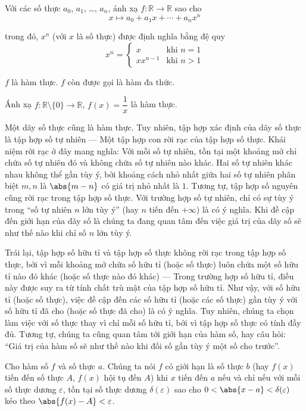 \begin{example}
    Với các số thực $a_{0}$, $a_{1}$, \ldots, $a_{n}$, ánh xạ $f: \mathbb{R}\to \mathbb{R}$ sao cho
    \[
        x\mapsto a_{0} + a_{1}x + \cdots + a_{n}x^{n}
    \]

    trong đó, $x^{n}$ (với $x$ là số thực) được định nghĩa bằng đệ quy
    \[
        x^{n} = \begin{cases}
            x        & \text{khi $n = 1$} \\
            xx^{n-1} & \text{khi $n > 1$}
        \end{cases}
    \]

    $f$ là hàm thực. $f$ còn được gọi là hàm đa thức.
\end{example}

\begin{example}
    Ánh xạ $f: \mathbb{R}\setminus\{ 0 \}\to \mathbb{R}$, $f(x) = \dfrac{1}{x}$ là hàm thực.
\end{example}

Một dãy số thực cũng là hàm thực. Tuy nhiên, tập hợp xác định của dãy số thực là tập hợp số tự nhiên --- Một tập hợp con rời rạc của tập hợp số thực. Khái niệm rời rạc ở đây mang nghĩa: Với mỗi số tự nhiên, tồn tại một khoảng mở chỉ chứa số tự nhiên đó và không chứa số tự nhiên nào khác. Hai số tự nhiên khác nhau không thể gần tùy ý, bởi khoảng cách nhỏ nhất giữa hai số tự nhiên phân biệt $m, n$ là $\abs{m - n}$ có giá trị nhỏ nhất là $1$. Tương tự, tập hợp số nguyên cũng rời rạc trong tập hợp số thực. Với trường hợp số tự nhiên, chỉ có sự tùy ý trong ``số tự nhiên $n$ lớn tùy ý'' (hay $n$ tiến đến $+\infty$) là có ý nghĩa. Khi đề cập đến giới hạn của dãy số là chúng ta đang quan tâm đến việc giá trị của dãy số sẽ như thế nào khi chỉ số $n$ lớn tùy ý.

Trái lại, tập hợp số hữu tỉ và tập hợp số thực không rời rạc trong tập hợp số thực, bởi vì mỗi khoảng mở chứa số hữu tỉ (hoặc số thực) luôn chứa một số hữu tỉ nào đó khác (hoặc số thực nào đó khác) --- Trong trường hợp số hữu tỉ, điều này được suy ra từ tính chất trù mật của tập hợp số hữu tỉ. Như vậy, với số hữu tỉ (hoặc số thực), việc đề cập đến các số hữu tỉ (hoặc các số thực) gần tùy ý với số hữu tỉ đã cho (hoặc số thực đã cho) là có ý nghĩa. Tuy nhiên, chúng ta chọn làm việc với số thực thay vì chỉ mỗi số hữu tỉ, bởi vì tập hợp số thực có tính đầy đủ. Tương tự, chúng ta cũng quan tâm tới giới hạn của hàm số, hay câu hỏi: ``Giá trị của hàm số sẽ như thế nào khi đối số gần tùy ý một số cho trước''.

\begin{definition}
    Cho hàm số $f$ và số thực $a$. Chúng ta nói $f$ có giới hạn là số thực $b$ (hay $f(x)$ tiến đến số thực $A$, $f(x)$ hội tụ đến $A$) khi $x$ tiến đến $a$ nếu và chỉ nếu với mỗi số thực dương $\varepsilon$, tồn tại số thực dương $\delta(\varepsilon)$ sao cho $0 < \abs{x - a} < \delta(\varepsilon)$ kéo theo $\abs{f(x) - A} < \varepsilon$.
\end{definition}

